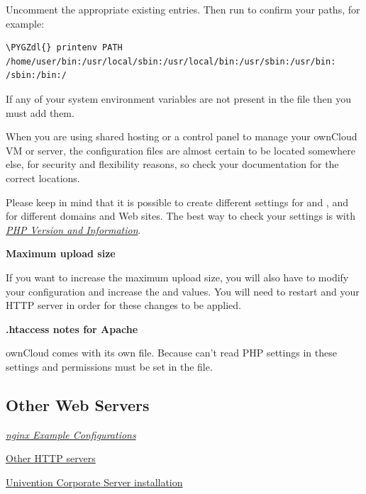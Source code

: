 \documentclass[letterpaper,10pt,english]{sphinxmanual}
\def\PYGZdl{\char`\$}
\begin{document}
Uncomment the appropriate existing entries. Then run  to
confirm your paths, for example:

\begin{Verbatim}[commandchars=\\\{\}]
\PYGZdl{} printenv PATH
/home/user/bin:/usr/local/sbin:/usr/local/bin:/usr/sbin:/usr/bin:
/sbin:/bin:/
\end{Verbatim}

If any of your system environment variables are not present in the file then
you must add them.

When you are using shared hosting or a control panel to manage your ownCloud VM
or server, the configuration files are almost certain to be located somewhere
else, for security and flexibility reasons, so check your documentation for the
correct locations.

Please keep in mind that it is possible to create different settings for
 and , and for different domains and Web sites.
The best way to check your settings is with {\hyperref[issues/general_troubleshooting:label\string-phpinfo]{\emph{PHP Version and Information}}}.

\textbf{Maximum upload size}

If you want to increase the maximum upload size, you will also have to modify
your  configuration and increase the  and
 values. You will need to restart  and your HTTP
server in order for these changes to be applied.

\textbf{.htaccess notes for Apache}

ownCloud comes with its own  file. Because  can't
read PHP settings in  these settings and permissions must be set
in the  file.


\subsection{Other Web Servers}
\label{installation/source_installation:other-http-servers-label}\label{installation/source_installation:other-web-servers}
{\hyperref[installation/nginx_examples::doc]{\emph{\emph{nginx Example Configurations}}}}

\href{https://github.com/owncloud/documentation/wiki/Alternate-Web-server-notes}{Other HTTP servers}

\href{https://github.com/owncloud/documentation/wiki/UCS-Installation}{Univention Corporate Server installation}
\end{document}
